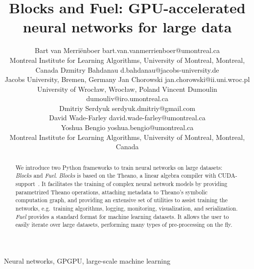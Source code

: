\documentclass[twoside,11pt]{article}
\begin{document}
\title{Blocks and Fuel: GPU-accelerated neural networks for large data}

\author{\name Bart van Merri\"{e}nboer \email bart.van.vanmerrienboer@umontreal.ca \\
        \addr Montreal Institute for Learning Algorithms, University of Montreal, Montreal, Canada
        \AND
        \name Dzmitry Bahdanau \email d.bahdanau@jacobs-university.de \\
        \addr Jacobs University, Bremen, Germany
        \AND
        \name Jan Chorowski \email jan.chorowski@ii.uni.wroc.pl \\
        \addr University of Wroc\l aw, Wroc\l aw, Poland
        \AND
        \name Vincent Dumoulin \email dumouliv@iro.umontreal.ca \\
        \name Dmitriy Serdyuk \email serdyuk.dmitriy@gmail.com \\
        \name David Wade-Farley \email david.wade-farley@umontreal.ca \\
        \name Yoshua Bengio \email yoshua.bengio@umontreal.ca \\
        \addr Montreal Institute for Learning Algorithms, University of Montreal, Montreal, Canada}


\maketitle

\begin{abstract}%
  We introduce two Python frameworks to train neural networks on large
  datasets: \emph{Blocks} and \emph{Fuel}. \emph{Blocks} is based on the
  Theano, a linear algebra compiler with
  CUDA-support~\citep{Bastien-Theano-2012,bergstra+al:2010-scipy}. It
  facilitates the training of complex neural network models by providing
  parametrized Theano operations, attaching metadata to Theano's symbolic
  computation graph, and providing an extensive set of utilities to assist
  training the networks, e.g.\ training algorithms, logging, monitoring,
  visualization, and serialization. \emph{Fuel} provides a standard format for
  machine learning datasets. It allows the user to easily iterate over large
  datasets, performing many types of pre-processing on the fly.
\end{abstract}

\begin{keywords}
  Neural networks, GPGPU, large-scale machine learning
\end{keywords}
\end{document}
